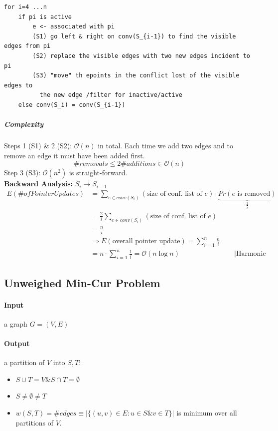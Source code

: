 \begin{verbatim}
for i=4 ...n
    if pi is active
        e <- associated with pi
        (S1) go left & right on conv(S_{i-1}) to find the visible edges from pi
        (S2) replace the visible edges with two new edges incident to pi
        (S3) "move" th epoints in the conflict lost of the visible edges to 
          the new edge /filter for inactive/active
    else conv(S_i) = conv(S_{i-1})
\end{verbatim}
\subparagraph{Complexity} Steps 1 (S1) \& 2 (S2): $\mathcal{O}(n)$ in total. Each time we add two edges and to remove an edge it must have been added first. 
$$\#removals \leq 2\#additions \in \mathcal{O}(n)$$
Step 3 (S3): $\mathcal{O}(n^2)$ is straight-forward. \\ 
\textbf{Backward Analysis:} $S_i \rightarrow S_{i-1}$ \\
\begin{align*}
E(\#ofPointerUpdates) &= \sum_{e \in conv(S_i)}(\text{size of conf. list of }e) \cdot \underbrace{Pr(e\text{ is removed})}_{\frac{2}{i}} \\
&= \frac{2}{i} \sum_{e \in conv(S_i)}(\text{size of conf. list of }e) \\ &= \frac{n}{i} \\
&\Rightarrow E(\text{overall pointer update}) = \sum_{i = 1}^{n} \frac{n}{i}\\ &= n \cdot \sum_{i = 1}^{n} \frac{1}{i} = \mathcal{O}(n \log n) & |\text{Harmonic sequence}
\end{align*}
\subsection{Unweighed Min-Cur Problem}
\paragraph{Input} a graph $G = (V,E)$
\paragraph{Output} a partition of $V$ into $S,T$:
\begin{itemize}
	\item $S \cup T = V \& S \cap T = \emptyset$
	\item $S \neq \emptyset \neq T$
	\item $w(S,T) = \#edges \equiv | \{(u,v) \in E: u \in S \& v \in T \}|$ is minimum over all partitions of $V$. 
\end{itemize}
